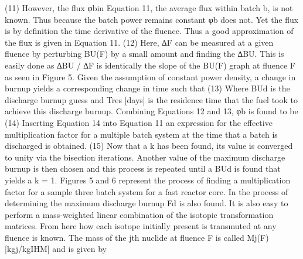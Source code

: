                                                 (11)
However, the flux φbin Equation 11, the average flux within batch b, is not known.  Thus because the batch power remains constant φb does not.  Yet the flux is by definition the time derivative of the fluence. Thus a good approximation of the flux is given in Equation 11.
                                                (12)
Here, ∆F can be measured at a given fluence by perturbing BU(F) by a small amount and finding the ∆BU.  This is easily done as ∆BU / ∆F is identically the slope of the BU(F) graph at fluence F as seen in Figure 5.  Given the assumption of constant power density, a change in burnup yields a corresponding change in time such that
                                        (13)
Where BUd is the discharge burnup guess and Tres [days] is the residence time that the fuel took to achieve this discharge burnup. Combining Equations 12 and 13, φb is found to be
                                        (14)
Inserting Equation 14 into Equation 11 an expression for the effective multiplication factor for a multiple batch system at the time that a batch is discharged is obtained.
                        (15)
Now that a k has been found, its value is converged to unity via the bisection iterations.  Another value of the maximum discharge burnup is then chosen and this process is repeated until a BUd is found that yields a k = 1.  Figures 5 and 6 represent the process of finding a multiplication factor for a sample three batch system for a fast reactor core.  
In the process of determining the maximum discharge burnup Fd is also found.  It is also easy to perform a mass-weighted linear combination of the isotopic transformation matrices. From here how each isotope initially present is transmuted at any fluence is known.  The mass of the jth nuclide at fluence F is called Mj(F) [kgj/kgIHM] and is given by

